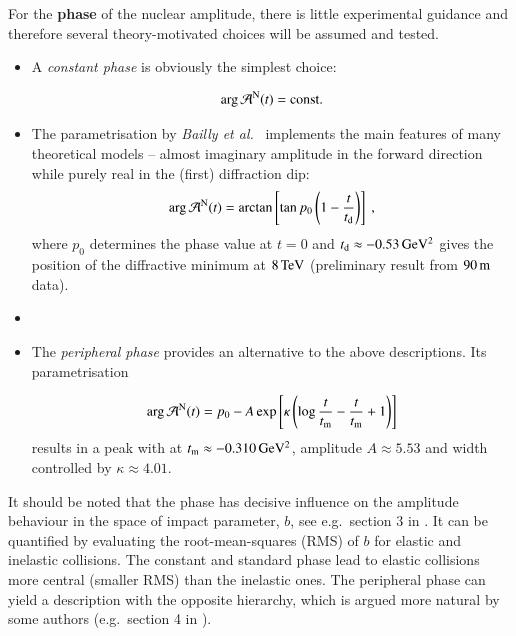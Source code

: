 For the {\bf phase} of the nuclear amplitude, there is little experimental guidance and therefore several theory-motivated choices will be assumed and tested.

\begin{itemize}

\item A {\it constant phase} is obviously the simplest choice:

\begin{equation}
\label{eq:nuc phase const}
\arg {\cal A}^{\rm N}(t) = \hbox{const.}
\end{equation}

\item The parametrisation by {\em Bailly et al.}~\cite{bailly87} implements the main features of many theoretical models -- almost imaginary amplitude in the forward direction while purely real in the (first) diffraction dip:
\begin{equation}
\label{eq:nuc phase std}
	\arg {\cal A}^{\rm N}(t) = \arctan \left[ \tan p_0 \left(1 - {t\over t_{\rm d}} \right) \right]\ ,
\end{equation}
where $p_0$ determines the phase value at $t=0$ and $t_{\rm d} \approx -0.53\,{\rm GeV^2}$ gives the position of the diffractive minimum at $8\,{\rm TeV}$ (preliminary result from $90\,{\rm m}$ data).

\item {}

\item The {\it peripheral phase} \cite{kl94}  provides an alternative to the above descriptions. Its parametrisation


\begin{equation}
\label{eq:nuc phase per}
\arg {\cal A}^{\rm N}(t) = p_0 - A \exp\left[ \kappa \left( \log {t\over t_{\rm m}} - {t\over t_{\rm m}} + 1 \right) \right]
\end{equation}
results in a peak with at $t_{\rm m} \approx -0.310\,{\rm GeV^2}$, amplitude $A \approx 5.53$ and width controlled by $\kappa \approx 4.01$.

\end{itemize}

It should be noted that the phase has decisive influence on the amplitude behaviour in the space of impact parameter, $b$, see e.g.~section 3 in \cite{klk02}. It can be quantified by evaluating the root-mean-squares (RMS) of $b$ for elastic and inelastic collisions. The constant and standard phase lead to elastic collisions more central (smaller RMS) than the inelastic ones. The peripheral phase can yield a description with the opposite hierarchy, which is argued more natural by some authors (e.g.~section 4 in \cite{kl96}).

